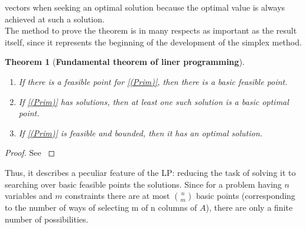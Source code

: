 \documentclass[a4paper,10 pt,titlepage,twoside]{book}
\theoremstyle{plain}
\newtheorem{thm}{Theorem}[chapter]
\theoremstyle{definition}
\theoremstyle{remark}
\begin{document}
vectors when seeking an optimal solution because the optimal
value is always achieved at such a solution.\\ The method to prove the theorem is in many respects as important as the result itself, since it represents the beginning of the development of the simplex
method.
\begin{thm}[\textbf{Fundamental theorem of liner programming}]\label{Fund}
\begin{enumerate}
	\
\item If there is a feasible point for \ref{(Prim)}, then there is a basic feasible point.
\item If \ref{(Prim)} has solutions, then at least one such solution is a basic optimal point.
\item If \ref{(Prim)} is feasible and bounded, then it has an optimal solution.
\end{enumerate}
\end{thm}
\begin{proof}
	See \cite{LP}
\end{proof}
Thus, it describes a peculiar feature of the LP: reducing the task of solving it to searching over basic feasible points the solutions. Since for a problem having $n$ variables and $m$ constraints there are at most ${n}\choose{m}$ basic points (corresponding to the number of ways of selecting m of n columns of $A$), there are only a finite number of possibilities. 
\end{document}
